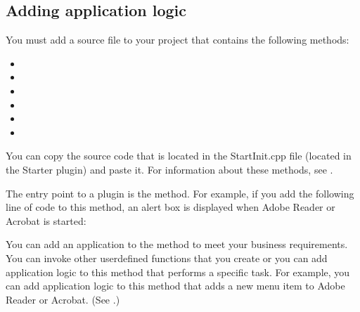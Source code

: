 \documentclass[letterpaper,12pt,english,openany,oneside]{sphinxmanual}
\begin{document}
\subsection{Adding application logic}
\label{\detokenize{Plugins_CreatingSimplePlug:adding-application-logic}}
You must add a source file to your project that contains the following methods:
\begin{itemize}
\item {} 

\item {} 

\item {} 

\item {} 

\item {} 

\item {} 

\end{itemize}

You can copy the source code that is located in the StartInit.cpp file (located in the Starter plugin) and paste it. For information about these methods, see .

The entry point to a plugin is the  method. For example, if you add the following line of code to this method, an alert box is displayed when Adobe Reader or Acrobat is started:

\begin{sphinxVerbatim}[commandchars=\\\{\}]
\end{sphinxVerbatim}

You can add an application to the  method to meet your business requirements. You can invoke other user\sphinxhyphen{}defined functions that you create or you can add application logic to this method that performs a specific task. For example, you can add application logic to this method that adds a new menu item to Adobe Reader or Acrobat. (See .)
\end{document}
